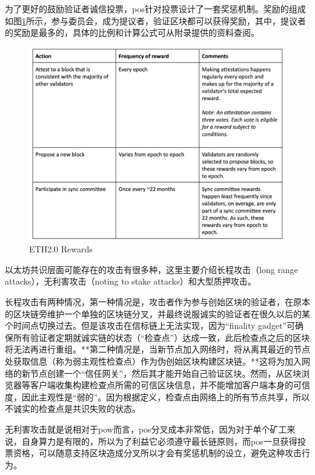 \documentclass[a4paper,twoside]{scrbook}
\begin{document}
\begin{CJK}{UTF8}{gbsn}
为了更好的鼓励验证者诚信投票，pos针对投票设计了一套奖惩机制。奖励的组成如图\ref{fig:reward}所示，参与委员会，成为提议者，验证区块都可以获得奖励，其中，提议者的奖励是最多的，具体的比例和计算公式可从附录提供的资料查阅。

\begin{figure}[!htbp]
\centering
\includegraphics[width=1\textwidth]{Figures/eth reward.png}
\caption{ETH2.0 Rewards} 
\label{fig:reward}
\end{figure}

以太坊共识层面可能存在的攻击有很多种，这里主要介绍长程攻击（long range attacks），无利害攻击（noting to stake attacks）和大型质押攻击。

长程攻击有两种情况，第一种情况是，攻击者作为参与创始区块的验证者，在原本的区块链旁维护一个单独的区块链分叉，并最终说服诚实的验证者在很久以后的某个时间点切换过去。但是该攻击在信标链上无法实现，因为“finality gadget”可确保所有验证者定期就诚实链的状态（“检查点”）达成一致，此后检查点之后的区块将无法再进行重组。**第二种情况是，当新节点加入网络时，将从离其最近的节点处获取信息（称为弱主观性检查点）作为伪创始区块构建区块链。**这将为加入网络的新节点创建一个“信任网关”，然后其才能开始自己验证区块。然而，从区块浏览器等客户端收集构建检查点所需的可信区块信息，并不能增加客户端本身的可信度，因此主观性是“弱的”。因为根据定义，检查点由网络上的所有节点共享，所以不诚实的检查点是共识失败的状态。

无利害攻击就是说相对于pow而言，pos分叉成本非常低，因为对于单个矿工来说，自身算力是有限的，所以为了利益它必须遵守最长链原则，而pos一旦获得投票资格，可以随意支持区块造成分叉所以才会有奖惩机制的设立，避免这种攻击行为。


\end{CJK}
\end{document}
